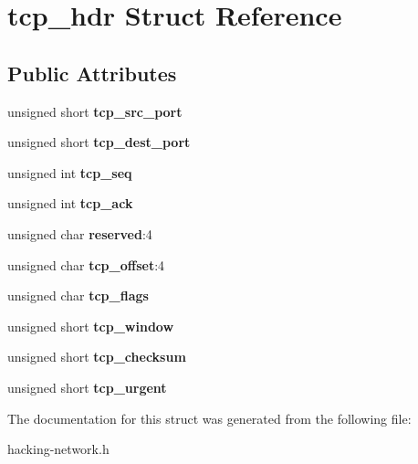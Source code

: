 \hypertarget{structtcp__hdr}{}\section{tcp\+\_\+hdr Struct Reference}
\label{structtcp__hdr}
\subsection*{Public Attributes}
\begin{DoxyCompactItemize}
\item 
unsigned short {\bfseries tcp\+\_\+src\+\_\+port}\hypertarget{structtcp__hdr_aa136b16207341d31d6ded12b85b4d2ba}{}\label{structtcp__hdr_aa136b16207341d31d6ded12b85b4d2ba}

\item 
unsigned short {\bfseries tcp\+\_\+dest\+\_\+port}\hypertarget{structtcp__hdr_a90e97bacd4c32851ba0d9b859297affb}{}\label{structtcp__hdr_a90e97bacd4c32851ba0d9b859297affb}

\item 
unsigned int {\bfseries tcp\+\_\+seq}\hypertarget{structtcp__hdr_ab831d1a38bb8ff93bf2acade137a711d}{}\label{structtcp__hdr_ab831d1a38bb8ff93bf2acade137a711d}

\item 
unsigned int {\bfseries tcp\+\_\+ack}\hypertarget{structtcp__hdr_aeaa8bb11cb2f52ec565ebb47f1e412b9}{}\label{structtcp__hdr_aeaa8bb11cb2f52ec565ebb47f1e412b9}

\item 
unsigned char {\bfseries reserved}\+:4\hypertarget{structtcp__hdr_ad791ec1d361c5ecc47c04cef06765a55}{}\label{structtcp__hdr_ad791ec1d361c5ecc47c04cef06765a55}

\item 
unsigned char {\bfseries tcp\+\_\+offset}\+:4\hypertarget{structtcp__hdr_a0caf29f03eabb0c93ec782a5f598fd94}{}\label{structtcp__hdr_a0caf29f03eabb0c93ec782a5f598fd94}

\item 
unsigned char {\bfseries tcp\+\_\+flags}\hypertarget{structtcp__hdr_a57f5cce6d80adf9068ce5dd24f087440}{}\label{structtcp__hdr_a57f5cce6d80adf9068ce5dd24f087440}

\item 
unsigned short {\bfseries tcp\+\_\+window}\hypertarget{structtcp__hdr_a32dc94859ff3068a5430b2da55a88371}{}\label{structtcp__hdr_a32dc94859ff3068a5430b2da55a88371}

\item 
unsigned short {\bfseries tcp\+\_\+checksum}\hypertarget{structtcp__hdr_a977ff214ee61b33b707a8b2105f1f8e6}{}\label{structtcp__hdr_a977ff214ee61b33b707a8b2105f1f8e6}

\item 
unsigned short {\bfseries tcp\+\_\+urgent}\hypertarget{structtcp__hdr_a27c6d010ef1f223788a7a7a0f5a67be0}{}\label{structtcp__hdr_a27c6d010ef1f223788a7a7a0f5a67be0}

\end{DoxyCompactItemize}


The documentation for this struct was generated from the following file\+:\begin{DoxyCompactItemize}
\item 
hacking-\/network.\+h\end{DoxyCompactItemize}
